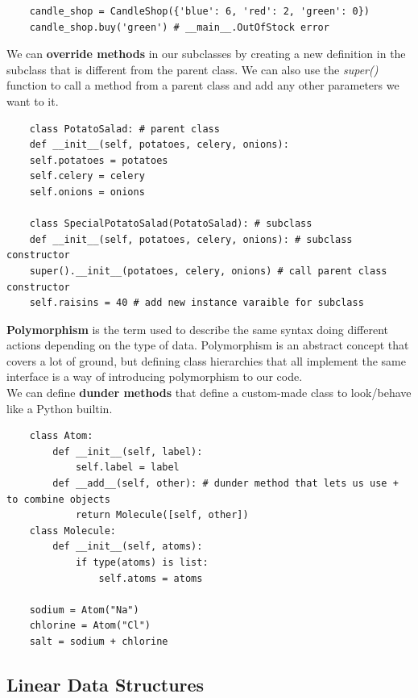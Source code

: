 \documentclass[11pt, a4paper]{article}
\begin{document}
\begin{spacing}{1.1}
\begin{lstlisting}
	candle_shop = CandleShop({'blue': 6, 'red': 2, 'green': 0})
	candle_shop.buy('green') # __main__.OutOfStock error \end{lstlisting} \newpage
	\noindent We can \textbf{override methods} in our subclasses by creating a new definition in the subclass that is different from the parent class. We can also use the \textit{super()} function to call a method from a parent class and add any other parameters we want to it. 
	\begin{lstlisting}
	class PotatoSalad: # parent class
	def __init__(self, potatoes, celery, onions):
	self.potatoes = potatoes
	self.celery = celery
	self.onions = onions
	
	class SpecialPotatoSalad(PotatoSalad): # subclass
	def __init__(self, potatoes, celery, onions): # subclass constructor
	super().__init__(potatoes, celery, onions) # call parent class constructor
	self.raisins = 40 # add new instance varaible for subclass \end{lstlisting}\vspace*{1mm}
	\textbf{Polymorphism} is the term used to describe the same syntax doing different actions depending on the type of data. Polymorphism is an abstract concept that covers a lot of ground, but defining class hierarchies that all implement the same interface is a way of introducing polymorphism to our code. \vspace*{1mm} \\
	We can define \textbf{dunder methods} that define a custom-made class to look/behave like a Python builtin. 
	\begin{lstlisting}
	class Atom:
		def __init__(self, label):
			self.label = label
		def __add__(self, other): # dunder method that lets us use + to combine objects
			return Molecule([self, other])	
	class Molecule:
		def __init__(self, atoms):
			if type(atoms) is list:
				self.atoms = atoms
	
	sodium = Atom("Na")
	chlorine = Atom("Cl")
	salt = sodium + chlorine \end{lstlisting}\vspace*{4mm}
	
	\subsection{Linear Data Structures}

\end{spacing}
\end{document}
